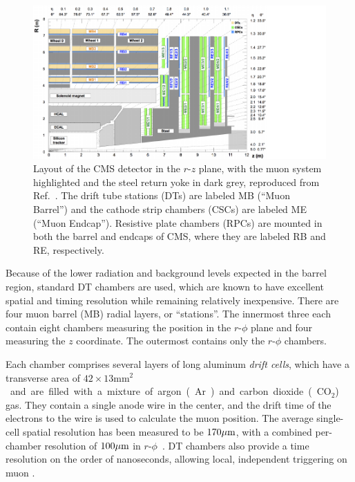 \begin{figure}[ht]
    \centering
    \includegraphics[trim=0pt 0pt 90pt 0pt, width=\textwidth]{figures/02-CMS/cms/components/muon_system}
    \caption[Layout of the CMS detector in the $r$-$z$ plane, with the muon system highlighted and the steel return yoke in dark grey, reproduced from Ref.~\cite{CMS:2018rym}.]{Layout of the CMS detector in the $r$-$z$ plane, with the muon system highlighted and the steel return yoke in dark grey, reproduced from Ref.~\cite{CMS:2018rym}.
    The drift tube stations (DTs) are labeled MB (“Muon Barrel”) and the cathode strip chambers (CSCs) are labeled ME (“Muon Endcap”). 
    Resistive plate chambers (RPCs) are mounted in both the barrel and endcaps of CMS, where they are labeled RB and RE, respectively.
    }
    \label{fig:02_cms_muon}
\end{figure}

Because of the lower radiation and background levels expected in the barrel region, standard DT chambers are used, which are known to have excellent spatial and timing resolution while remaining relatively inexpensive.
There are four muon barrel (MB) radial layers, or ``stations''.
The innermost three each contain eight chambers measuring the position in the $r$-$\phi$ plane and four measuring the $z$ coordinate.
The outermost contains only the $r$-$\phi$ chambers.

Each chamber comprises several layers of long aluminum \textit{drift cells}, which have a transverse area of $42\times13$\unit{mm$^2$} and are filled with a mixture of argon (Ar) and carbon dioxide (CO$_2$) gas.
They contain a single anode wire in the center, and the drift time of the electrons to the wire is used to calculate the muon position.
The average single-cell spatial resolution has been measured to be $170\mu\text{m}$, with a combined per-chamber resolution of $100\mu\text{m}$ in $r$-$\phi$~\cite{CMS:2008xjf}.
DT chambers also provide a time resolution on the order of nanoseconds, allowing local, independent triggering on muon \pt.

